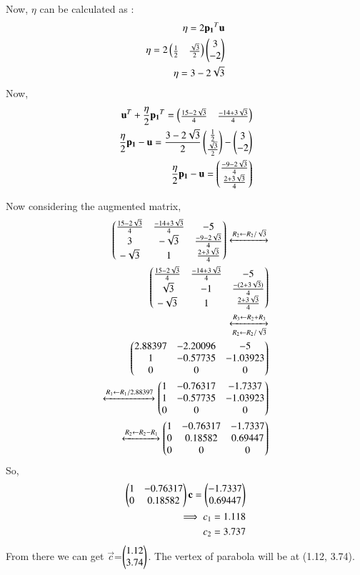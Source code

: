 \documentclass[journal,12pt,twocolumn]{IEEEtran}
\begin{document}
Now, $\eta$ can be calculated as : 
\begin{align}
\eta = 2 \mathbf{p_1}^T \mathbf{u}\\
\eta = 2 \begin{pmatrix}\frac{1}{2} & \frac{\sqrt{3}}{2}\end{pmatrix} \begin{pmatrix}3 \\ -2\end{pmatrix}\\
\eta =  3-2\sqrt{3}
\end{align}
Now, 
\begin{align}
\mathbf{u}^T + \frac{\eta}{2}\mathbf{p_1}^T = \begin{pmatrix}\frac{15-2\sqrt{3}}{4} & \frac{-14+3\sqrt{3}}{4}\end{pmatrix}\\
\frac{\eta}{2} \mathbf{p_1} -\mathbf{u}= \frac{3-2\sqrt{3}}{2}\begin{pmatrix}\frac{1}{2}\\ \frac{\sqrt{3}}{2} \end{pmatrix} - \begin{pmatrix}3\\-2\end{pmatrix}\\
\frac{\eta}{2} \mathbf{p_1} -\mathbf{u}=\begin{pmatrix}\frac{-9-2\sqrt{3}}{4}\\\frac{2+3\sqrt{3}}{4}\end{pmatrix}
\end{align}

Now considering the augmented matrix,
\begin{align}
\begin{pmatrix}\frac{15-2\sqrt{3}}{4} & \frac{-14+3\sqrt{3}}{4} & -5\\3 & -\sqrt{3} & \frac{-9-2\sqrt{3}}{4}\\-\sqrt{3} & 1 & \frac{2+3\sqrt{3}}{4}\end{pmatrix}\xleftrightarrow[]{R_2\leftarrow R_2/\sqrt{3}}\\
\begin{pmatrix}\frac{15-2\sqrt{3}}{4} & \frac{-14+3\sqrt{3}}{4} & -5\\\sqrt{3} & -1 & \frac{-(2+3\sqrt{3})}{4}\\-\sqrt{3} & 1 & \frac{2+3\sqrt{3}}{4}\end{pmatrix}\\
\xleftrightarrow[R_2\leftarrow R_2/\sqrt{3}]{R_3\leftarrow R_2+R_3}\\
\begin{pmatrix}2.88397 & -2.20096 & -5\\1 & -0.57735 & -1.03923\\0 & 0 & 0\end{pmatrix}\\
\xleftrightarrow[]{R_1\leftarrow R_1/2.88397}
\begin{pmatrix}1 & -0.76317 & -1.7337\\1 & -0.57735 & -1.03923\\0 & 0 & 0\end{pmatrix}\\
\xleftrightarrow[]{R_2\leftarrow R_2-R_1}
\begin{pmatrix}1 & -0.76317 & -1.7337\\0 & 0.18582 & 0.69447\\0 & 0 & 0\end{pmatrix}
\end{align}
So, 
\begin{align}
\begin{pmatrix}1 & -0.76317\\0 & 0.18582\end{pmatrix}\mathbf{c}=\begin{pmatrix}-1.7337\\0.69447\end{pmatrix}\\
\implies c_1= 1.118\\
c_2=3.737
\end{align}
From there we can get $\vec{c}$=$\begin{pmatrix}1.12\\3.74\end{pmatrix}$. The vertex of parabola will be at (1.12, 3.74).
\end{document}
